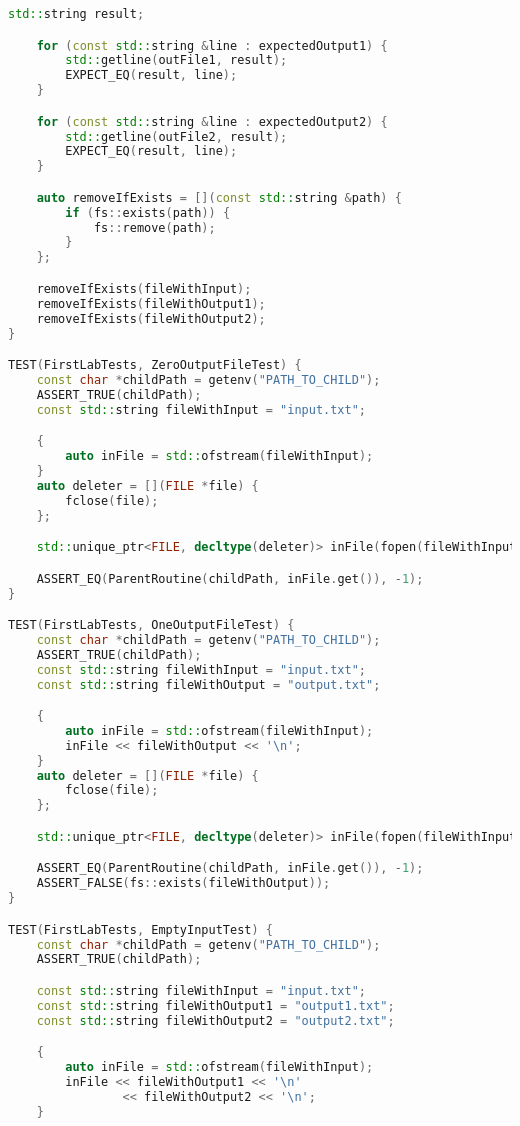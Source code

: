 \documentclass[a4paper, 12pt]{article}
\begin{document}
\begin{lstlisting}[language=C++]
    std::string result;

    for (const std::string &line : expectedOutput1) {
        std::getline(outFile1, result);
        EXPECT_EQ(result, line);
    }

    for (const std::string &line : expectedOutput2) {
        std::getline(outFile2, result);
        EXPECT_EQ(result, line);
    }

    auto removeIfExists = [](const std::string &path) {
        if (fs::exists(path)) {
            fs::remove(path);
        }
    };

    removeIfExists(fileWithInput);
    removeIfExists(fileWithOutput1);
    removeIfExists(fileWithOutput2);
}

TEST(FirstLabTests, ZeroOutputFileTest) {
    const char *childPath = getenv("PATH_TO_CHILD");
    ASSERT_TRUE(childPath);
    const std::string fileWithInput = "input.txt";

    {
        auto inFile = std::ofstream(fileWithInput);
    }
    auto deleter = [](FILE *file) {
        fclose(file);
    };

    std::unique_ptr<FILE, decltype(deleter)> inFile(fopen(fileWithInput.c_str(), "r"), deleter);

    ASSERT_EQ(ParentRoutine(childPath, inFile.get()), -1);
}

TEST(FirstLabTests, OneOutputFileTest) {
    const char *childPath = getenv("PATH_TO_CHILD");
    ASSERT_TRUE(childPath);
    const std::string fileWithInput = "input.txt";
    const std::string fileWithOutput = "output.txt";

    {
        auto inFile = std::ofstream(fileWithInput);
        inFile << fileWithOutput << '\n';
    }
    auto deleter = [](FILE *file) {
        fclose(file);
    };

    std::unique_ptr<FILE, decltype(deleter)> inFile(fopen(fileWithInput.c_str(), "r"), deleter);

    ASSERT_EQ(ParentRoutine(childPath, inFile.get()), -1);
    ASSERT_FALSE(fs::exists(fileWithOutput));
}

TEST(FirstLabTests, EmptyInputTest) {
    const char *childPath = getenv("PATH_TO_CHILD");
    ASSERT_TRUE(childPath);

    const std::string fileWithInput = "input.txt";
    const std::string fileWithOutput1 = "output1.txt";
    const std::string fileWithOutput2 = "output2.txt";

    {
        auto inFile = std::ofstream(fileWithInput);
        inFile << fileWithOutput1 << '\n'
                << fileWithOutput2 << '\n';
    }


\end{lstlisting}
\end{document}
